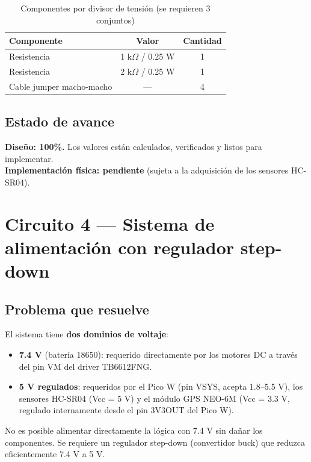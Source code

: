 \documentclass[12pt]{report}
\begin{document}
\begin{table}[H]
\centering
\renewcommand{\arraystretch}{1.3}
\begin{tabular}{|l|c|c|}
\hline
\textbf{Componente} & \textbf{Valor} & \textbf{Cantidad} \\
\hline
Resistencia & 1 k$\Omega$ / 0.25 W & 1 \\
Resistencia & 2 k$\Omega$ / 0.25 W & 1 \\
Cable jumper macho-macho & — & 4 \\
\hline
\end{tabular}
\caption{Componentes por divisor de tensión (se requieren 3 conjuntos)}
\end{table}

\subsection{Estado de avance}

\textbf{Diseño: 100\%.} Los valores están calculados, verificados y listos para implementar.\\
\textbf{Implementación física: pendiente} (sujeta a la adquisición de los sensores HC-SR04).

\section{Circuito 4 — Sistema de alimentación con regulador step-down}

\subsection{Problema que resuelve}

El sistema tiene \textbf{dos dominios de voltaje}:

\begin{itemize}
    \item \textbf{7.4 V} (batería 18650): requerido directamente por los motores DC a través del pin VM del driver TB6612FNG.
    \item \textbf{5 V regulados}: requeridos por el Pico W (pin VSYS, acepta 1.8--5.5 V), los sensores HC-SR04 (Vcc = 5 V) y el módulo GPS NEO-6M (Vcc = 3.3 V, regulado internamente desde el pin 3V3OUT del Pico W).
\end{itemize}

No es posible alimentar directamente la lógica con 7.4 V sin dañar los componentes. Se requiere un regulador step-down (convertidor buck) que reduzca eficientemente 7.4 V a 5 V.
\end{document}
